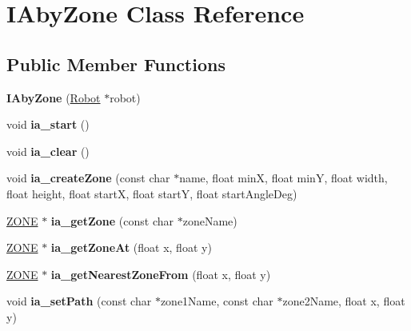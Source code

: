 \hypertarget{classIAbyZone}{}\section{I\+Aby\+Zone Class Reference}
\label{classIAbyZone}
\subsection*{Public Member Functions}
\begin{DoxyCompactItemize}
\item 
\mbox{\label{classIAbyZone_a0833ce7505fa142fe0f2c50e1d76a256}} 
{\bfseries I\+Aby\+Zone} (\hyperlink{classRobot}{Robot} $\ast$robot)
\item 
\mbox{\label{classIAbyZone_a0b591dae1e57bf13e5189a0a6de88823}} 
void {\bfseries ia\+\_\+start} ()
\item 
\mbox{\label{classIAbyZone_a80ba498fafeb69fbfe50a4203b9798ef}} 
void {\bfseries ia\+\_\+clear} ()
\item 
\mbox{\label{classIAbyZone_abeae91d56972242a6737e2cc55cf2f44}} 
void {\bfseries ia\+\_\+create\+Zone} (const char $\ast$name, float minX, float minY, float width, float height, float startX, float startY, float start\+Angle\+Deg)
\item 
\mbox{\label{classIAbyZone_a61160acbc872b83ef3006b306c5b7aab}} 
\hyperlink{structZONE}{Z\+O\+NE} $\ast$ {\bfseries ia\+\_\+get\+Zone} (const char $\ast$zone\+Name)
\item 
\mbox{\label{classIAbyZone_a9c661046334a8c99e4e89e335e7b483c}} 
\hyperlink{structZONE}{Z\+O\+NE} $\ast$ {\bfseries ia\+\_\+get\+Zone\+At} (float x, float y)
\item 
\mbox{\label{classIAbyZone_a1d40e763ea935fc4b09de7508fc71805}} 
\hyperlink{structZONE}{Z\+O\+NE} $\ast$ {\bfseries ia\+\_\+get\+Nearest\+Zone\+From} (float x, float y)
\item 
\mbox{\label{classIAbyZone_a4267911cde72e6b03181cb8746cea638}} 
void {\bfseries ia\+\_\+set\+Path} (const char $\ast$zone1\+Name, const char $\ast$zone2\+Name, float x, float y)

\end{DoxyCompactItemize}
